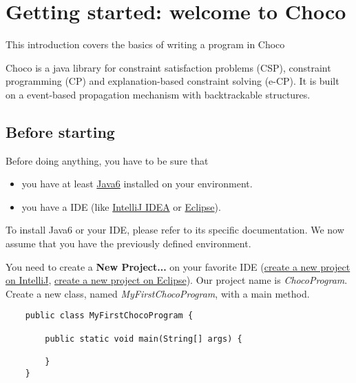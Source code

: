 \label{gettingstarted}
\hypertarget{gettingstarted}{}

\chapter{Getting started: welcome to Choco}\label{gettingstarted:gettingstarted:welcometochoco}\hypertarget{gettingstarted:gettingstarted:welcometochoco}{}
This introduction covers the basics of writing a program in Choco

Choco is a java library for constraint satisfaction problems (CSP), constraint programming (CP) and explanation-based constraint solving (e-CP). It is built on a event-based propagation mechanism with backtrackable structures. 

\section{Before starting}\label{gettingstarted:beforestarting}\hypertarget{gettingstarted:beforestarting}{}

Before doing anything, you have to be sure that 
\begin{itemize}
	\item you have at least \href{http://java.sun.com/javase/6/}{Java6} installed on your environment.
	\item you have a IDE (like \href{http://www.jetbrains.com/idea/}{IntelliJ IDEA} or \href{http://www.eclipse.org/}{Eclipse}).
\end{itemize}

To install Java6 or your IDE, please refer to its specific documentation. We now assume that you have the previously defined environment.

You need to create a \textbf{New Project...} on your favorite IDE (\href{http://www.jetbrains.com/idea/training/demos.html}{create a new project on IntelliJ}, \href{https://eclipse-tutorial.dev.java.net/eclipse-tutorial/part1.html}{create a new project on Eclipse}). Our project name is \emph{ChocoProgram}.
Create a new class, named \emph{MyFirstChocoProgram}, with a main method.
\begin{lstlisting}
	public class MyFirstChocoProgram {
	
	    public static void main(String[] args) {
	        
	    }
	}
\end{lstlisting}

